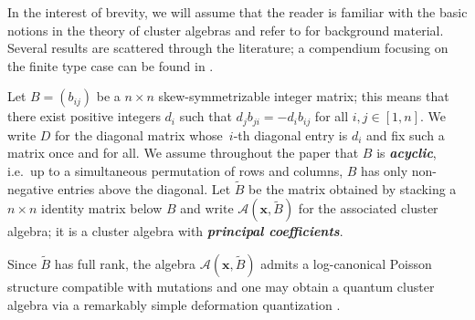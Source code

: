 \documentclass[pdftex]{sigma}
\newcommand{\bfx}{\mathbf{x}}
\newcommand{\cA}{\mathcal{A}}
\newcommand{\newword}[1]{\textbf{\emph{#1}}}
\begin{document}
  In the interest of brevity, we will assume that the reader is familiar with the basic notions in the theory of cluster algebras and refer to \cite{fomin-zelevinsky4} for background material.
  Several results are scattered through the literature; a compendium focusing on the finite type case can be found in \cite{hohlweg-pilaud-stella}.

  Let $B=(b_{ij})$ be a $n\times n$ skew-symmetrizable integer matrix; this means that there exist positive integers $d_i$ such that $d_jb_{ji}=-d_ib_{ij}$ for all $i,j\in[1,n]$. 
  We write $D$ for the diagonal matrix whose~$i$-th diagonal entry is $d_i$ and fix such a matrix once and for all.
  We assume throughout the paper that $B$ is \newword{acyclic}, i.e.\ up to a simultaneous permutation of rows and columns, $B$ has only non-negative entries above the diagonal.
  Let $\widetilde{B}$ be the matrix obtained by stacking a $n\times n$ identity matrix below $B$ and write $\cA(\bfx,\widetilde{B})$ for the associated cluster algebra; it is a cluster algebra with \newword{principal coefficients}.

  Since $\widetilde{B}$ has full rank, the algebra $\cA(\bfx,\widetilde{B})$ admits a log-canonical Poisson structure compatible with mutations \cite{gekhtman-shapiro-vainshtein} and one may obtain a quantum cluster algebra via a remarkably simple deformation quantization \cite{berenstein-zelevinsky}.  
\end{document}
